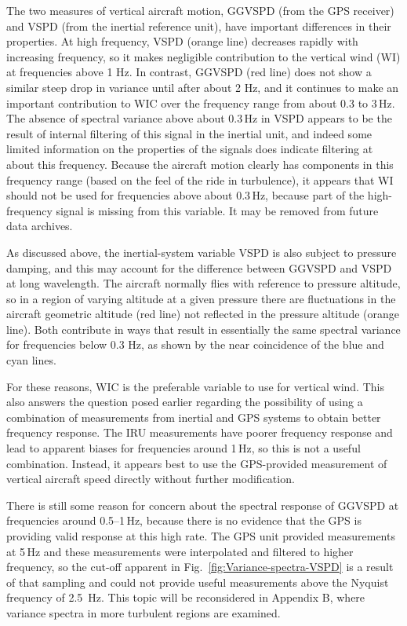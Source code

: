 \documentclass[12pt,twoside,english]{article}\usepackage[]{graphicx}\usepackage[]{color}
\let\OrgIndex\index
\renewcommand*{\index}[1]{\OrgIndex{#1}}
\begin{document}
The two measures of vertical aircraft motion, GGVSPD (from the GPS receiver) and VSPD (from the inertial reference unit), have important differences in their properties. At high frequency, VSPD (orange line) decreases rapidly with increasing frequency, so it makes negligible contribution to the vertical wind (WI) at frequencies above 1 Hz. In contrast, GGVSPD (red line) does not show a similar steep drop in variance until after about 2 Hz, and it continues to make an important contribution to WIC over the frequency range from about 0.3 to 3\,Hz. The absence of spectral variance above about 0.3\,Hz in VSPD appears to be the result of internal filtering of this signal in the inertial unit, and indeed some limited information on the properties of the signals does indicate filtering at about this frequency. Because the aircraft motion clearly has components in this frequency range (based on the feel of the ride in turbulence), it appears that WI should not be used for frequencies above about 0.3\,Hz, because part of the high-frequency signal is missing from this variable. It may be removed from future data archives.

As discussed above, the inertial-system variable VSPD is also subject to pressure damping, and this may account for the difference between GGVSPD and VSPD at long wavelength. The aircraft normally flies with reference to pressure altitude, so in a region of varying altitude at a given pressure there are fluctuations in the aircraft geometric altitude (red line) not reflected in the pressure altitude (orange line). Both contribute in ways that result in essentially the same spectral variance for frequencies below 0.3 Hz, as shown by the near coincidence of the blue and cyan lines.

For these reasons, WIC is the preferable variable to use for vertical wind. This also answers the question posed earlier regarding the possibility of using a combination of measurements from inertial and GPS systems to obtain better frequency response. The IRU measurements have poorer frequency response and lead to apparent biases for frequencies around 1\,Hz, so this is not a useful combination. Instead, it appears best to use the GPS-provided measurement of vertical aircraft speed directly without further modification. 

There is still some reason for concern about the spectral response of GGVSPD at frequencies around 0.5--1\,Hz, because there is no evidence that the GPS is providing valid response at this high rate. The GPS unit provided measurements at 5\,Hz and these measurements were interpolated and filtered to higher frequency, so the cut-off apparent in Fig.~\ref{fig:Variance-spectra-VSPD} is a result of that sampling and could not provide useful measurements above the Nyquist frequency of 2.5~Hz. This topic will be reconsidered in Appendix B, where variance spectra in more turbulent regions are examined. 
\end{document}
